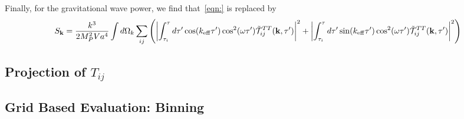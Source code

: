 \documentclass{revtex4}
\begin{document}
Finally, for the gravitational wave power, we find that~\eqref{eqn:} is replaced by
\begin{equation}
  S_{\bf k} = \frac{k^3}{2M_P^2Va^4}\int d\Omega_k\sum_{ij}\left(\left|\int_{\tau_i}^\tau d\tau'\cos(k_{\rm eff}\tau')\cos^2(\omega \tau')\tilde{\mathcal{T}}^{TT}_{ij}({\bf k},\tau')\right|^2 + \left|\int_{\tau_i}^\tau d\tau'\sin(k_{\rm eff}\tau')\cos^2(\omega \tau')\tilde{\mathcal{T}}^{TT}_{ij}({\bf k},\tau')\right|^2 \right)
\end{equation}

\subsection{Projection of $T_{ij}$}

\subsection{Grid Based Evaluation: Binning}
\end{document}
